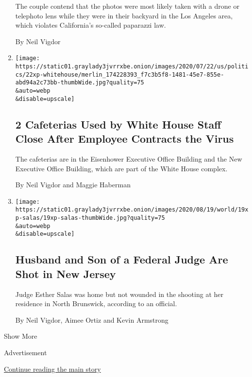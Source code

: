 \begin{enumerate}
  The couple contend that the photos were most likely taken with a drone
  or telephoto lens while they were in their backyard in the Los Angeles
  area, which violates California's so-called paparazzi law.

  By Neil Vigdor
\item
  \href{/2020/07/22/us/politics/white-house-employee-covid-19.html}{}

  \texttt{[image: https://static01.graylady3jvrrxbe.onion/images/2020/07/22/us/politics/22xp-whitehouse/merlin\_174228393\_f7c3b5f8-1481-45e7-855e-abd94a2c73bb-thumbWide.jpg?quality=75\\\&auto=webp\\\&disable=upscale]}

  \hypertarget{2-cafeterias-used-by-white-house-staff-close-after-employee-contracts-the-virus}{%
  \subsection{2 Cafeterias Used by White House Staff Close After
  Employee Contracts the
  Virus}\label{2-cafeterias-used-by-white-house-staff-close-after-employee-contracts-the-virus}}

  The cafeterias are in the Eisenhower Executive Office Building and the
  New Executive Office Building, which are part of the White House
  complex.

  By Neil Vigdor and Maggie Haberman
\item
  \href{/2020/07/19/nyregion/shooting-nj-judge-esther-salas.html}{}

  \texttt{[image: https://static01.graylady3jvrrxbe.onion/images/2020/08/19/world/19xp-salas/19xp-salas-thumbWide.jpg?quality=75\\\&auto=webp\\\&disable=upscale]}

  \hypertarget{husband-and-son-of-a-federal-judge-are-shot-in-new-jersey}{%
  \subsection{Husband and Son of a Federal Judge Are Shot in New
  Jersey}\label{husband-and-son-of-a-federal-judge-are-shot-in-new-jersey}}

  Judge Esther Salas was home but not wounded in the shooting at her
  residence in North Brunswick, according to an official.

  By Neil Vigdor, Aimee Ortiz and Kevin Armstrong
\end{enumerate}

Show More

Advertisement

\protect\hyperlink{after-mid2}{Continue reading the main story}

